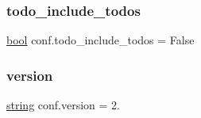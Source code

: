 \subsubsection{\texorpdfstring{todo\_include\_todos}{todo\_include\_todos}}
{\footnotesize\ttfamily \mbox{\hyperlink{asdl_8h_af6a258d8f3ee5206d682d799316314b1}{bool}} conf.\+todo\+\_\+include\+\_\+todos = False}

\mbox{\label{namespaceconf_ade15c5b54093b64d7c428ec19ca5b1cb}} 
\subsubsection{\texorpdfstring{version}{version}}
{\footnotesize\ttfamily \mbox{\hyperlink{asdl_8h_ae84541b4f3d8e1ea24ec0f466a8c568b}{string}} conf.\+version = \textquotesingle{}2.\textquotesingle{}}

